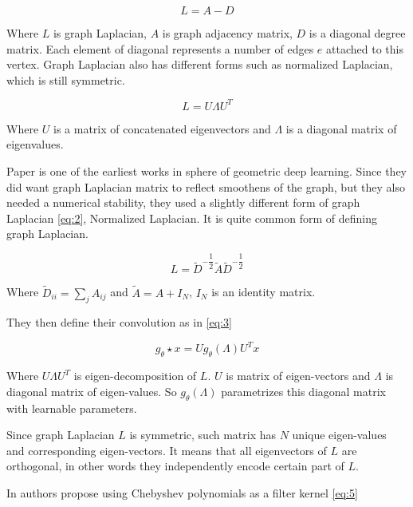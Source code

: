 \begin{equation}
    L=A-D
    \label{eq:1}
\end{equation}

Where $L$ is graph Laplacian, $A$ is graph adjacency matrix, $D$ is a diagonal degree matrix. Each element of diagonal represents a number of edges $e$ attached to this vertex. Graph Laplacian also has different forms such as normalized Laplacian, which is still symmetric.

\begin{equation}
    L=U\Lambda U^T
    \label{eq:eigen_decomposition}
\end{equation}

Where $U$ is a matrix of concatenated eigenvectors and $\Lambda$ is a diagonal matrix of eigenvalues.

Paper \cite{Kipf_Welling_2017} is one of the earliest works in sphere of geometric deep learning. Since they did want graph Laplacian matrix to reflect smoothens of the graph, but they also needed a numerical stability, they used a slightly different form of graph Laplacian \ref{eq:2}, Normalized Laplacian. It is quite common form of defining graph Laplacian.

\begin{equation}
    L=\tilde{D}^{-\dfrac{1}{2}}\tilde{A}\tilde{D}^{-\dfrac{1}{2}}
    \label{eq:2}
\end{equation}

Where $\tilde{D}_{ii}=\sum_j{A_{ij}}$ and $\tilde{A}=A+I_N$, $I_N$ is an identity matrix.

They then define their convolution as in \ref{eq:3}

\begin{equation}
    g_\theta\star x=Ug_\theta(\Lambda) U^Tx
    \label{eq:3}
\end{equation}

Where $U\Lambda U^T$ is eigen-decomposition of $L$. $U$ is matrix of eigen-vectors and $\Lambda$ is diagonal matrix of eigen-values. So $g_\theta(\Lambda)$ parametrizes this diagonal matrix with learnable parameters.

Since graph Laplacian $L$ is symmetric, such matrix has $N$ unique eigen-values and corresponding eigen-vectors. It means that all eigenvectors of $L$ are orthogonal, in other words they independently encode certain part of $L$.

In \cite{Defferrard_Bresson_Vandergheynst_2017} authors propose using Chebyshev polynomials as a filter kernel \ref{eq:5}

